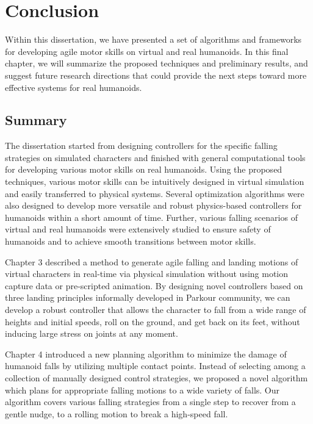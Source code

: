 \chapter{Conclusion}

Within this dissertation, we have presented a set of algorithms and frameworks
for developing agile motor skills on virtual and real humanoids.
In this final chapter, we will summarize the proposed techniques and
preliminary results, and suggest future research directions that could provide
the next steps toward more effective systems for real humanoids.

\section{Summary}
The dissertation started from designing controllers for the specific falling
strategies on simulated characters and finished with general computational
tools for developing various motor skills on real humanoids. 
Using the proposed techniques, various motor skills can be intuitively designed
in virtual simulation and easily transferred to physical systems.
Several optimization algorithms were also designed to develop more versatile and
robust physics-based controllers for humanoids within a short amount of time.
Further, various falling scenarios of virtual and real humanoids were
extensively studied to ensure safety of humanoids and to achieve smooth
transitions between motor skills.

Chapter 3 described a method to generate agile falling and landing motions of
virtual characters in real-time via physical simulation
without using motion capture data or pre-scripted animation.
By designing novel controllers based on three landing principles informally
developed in Parkour community, we can develop a robust controller that
allows the character to fall from a wide range of heights and initial speeds,
roll on the ground, and get back on its feet, without inducing large stress on
joints at any moment.

Chapter 4 introduced a new planning algorithm to minimize the damage
of humanoid falls by utilizing multiple contact points.
Instead of selecting among a collection of manually designed control
strategies, we proposed a novel algorithm which plans for appropriate
falling motions to a wide variety of falls.
Our algorithm covers various falling strategies from a single step to recover
from a gentle nudge, to a rolling motion to break a high-speed fall.


